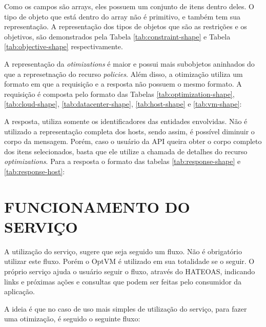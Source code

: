 

Como os campos são arrays, eles possuem um conjunto de itens dentro deles. O tipo
de objeto que está dentro do array não é primitivo, e também tem sua representação.
A representação dos tipos de objetos que são as restrições e os objetivos, são demonstrados
pela Tabela \ref{tab:constraint-shape} e Tabela \ref{tab:objective-shape} respectivamente.




A representação da \textit{otimizations} é maior e possui mais subobjetos aninhados
do que a represetnação do recurso \textit{policies}. Além disso, a otimização utiliza 
um formato em que a requisição e a resposta não possuem o mesmo formato. A requisição
é composta pelo formato das Tabelas \ref{tab:optimization-shape}, \ref{tab:cloud-shape},
\ref{tab:datacenter-shape}, \ref{tab:host-shape} e \ref{tab:vm-shape}:







A resposta, utiliza somente os identificadores das entidades envolvidas. Não
é utilizado a representação completa dos hosts, sendo assim, é possível
diminuir o corpo da mensagem. Porém, caso o usuário da API queira obter 
o corpo completo dos itens selecionados, basta que ele utilize a chamada de 
detalhes do recurso \textit{optimizations}. Para a resposta o formato das
tabelas \ref{tab:response-shape} e \ref{tab:response-host}:




\section{FUNCIONAMENTO DO SERVIÇO}

A utilização do serviço, sugere que seja seguido um fluxo. Não é obrigatório
utilizar este fluxo. Porém o OptVM é utilizado em sua totalidade se o seguir. 
O próprio serviço ajuda o usuário seguir o fluxo, através do HATEOAS, indicando 
links e próximas ações e consultas que podem ser feitas pelo consumidor da aplicação.

A ideia é que no caso de uso mais simples de utilização do serviço, 
para fazer uma otimização, é seguido o seguinte fluxo:

